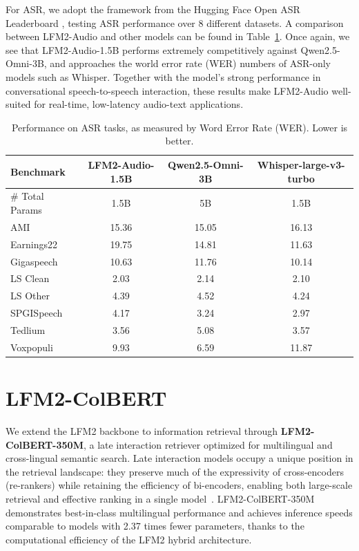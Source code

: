 \documentclass{article}
\begin{document}
For ASR, we adopt the framework from the Hugging Face Open ASR Leaderboard \citep{open-asr-leaderboard}, testing ASR performance over 8 different datasets. A comparison between LFM2-Audio and other models can be found in Table~\ref{tab:audio_asr}. Once again, we see that LFM2-Audio-1.5B performs extremely competitively against Qwen2.5-Omni-3B, and approaches the world error rate (WER) numbers of ASR-only models such as Whisper.
Together with the model's strong performance in conversational speech-to-speech interaction, these results make LFM2-Audio well-suited for real-time, low-latency audio-text applications.

\begin{table}
\centering
\small
\begin{tabular}{lccc}
\toprule
\textbf{Benchmark} & \textbf{LFM2-Audio-1.5B} & \textbf{Qwen2.5-Omni-3B} & \textbf{Whisper-large-v3-turbo} \\
\midrule
\# Total Params & 1.5B & 5B & 1.5B \\
\midrule
AMI          & 15.36 & 15.05 & 16.13 \\
Earnings22   & 19.75 & 14.81 & 11.63 \\
Gigaspeech   & 10.63 & 11.76 & 10.14 \\
LS Clean     & 2.03 & 2.14  & 2.10  \\
LS Other     & 4.39 & 4.52  & 4.24  \\
SPGISpeech   & 4.17 & 3.24  & 2.97  \\
Tedlium      & 3.56 & 5.08  & 3.57  \\
Voxpopuli    & 9.93 & 6.59  & 11.87 \\
\bottomrule
\end{tabular}
\caption{Performance on ASR tasks, as measured by Word Error Rate (WER). Lower is better.}
\label{tab:audio_asr}
\end{table}

\section{LFM2-ColBERT}
\label{sec:colbert}

We extend the LFM2 backbone to information retrieval through \textbf{LFM2-ColBERT-350M}, a late interaction retriever optimized for multilingual and cross-lingual semantic search. Late interaction models occupy a unique position in the retrieval landscape: they preserve much of the expressivity of cross-encoders (re-rankers) while retaining the efficiency of bi-encoders, enabling both large-scale retrieval and effective ranking in a single model~\citep{khattab2020colbert}. LFM2-ColBERT-350M demonstrates best-in-class multilingual performance and achieves inference speeds comparable to models with 2.37 times fewer parameters, thanks to the computational efficiency of the LFM2 hybrid architecture.
\end{document}
